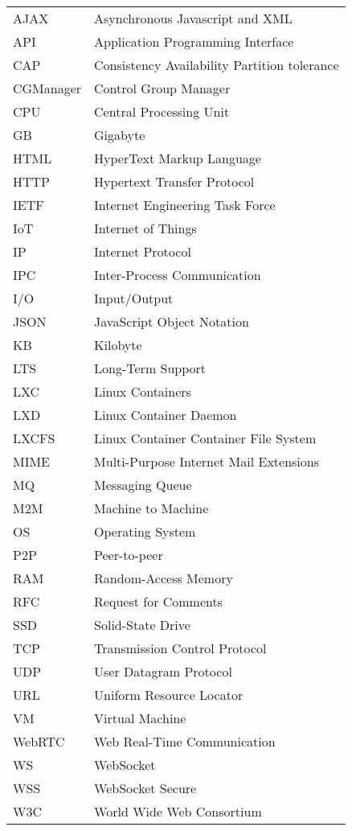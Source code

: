 \begin{longtable}{@{}p{}p{}@{}}
AJAX & Asynchronous Javascript and XML \\
API & Application Programming Interface \\
CAP & Consistency Availability Partition tolerance \\
CGManager & Control Group Manager \\
CPU & Central Processing Unit \\
GB & Gigabyte \\
HTML & HyperText Markup Language \\
HTTP & Hypertext Transfer Protocol \\
IETF & Internet Engineering Task Force \\
IoT & Internet of Things \\
IP & Internet Protocol \\
IPC & Inter-Process Communication \\
I/O & Input/Output \\
JSON & JavaScript Object Notation \\
KB & Kilobyte \\
LTS & Long-Term Support \\
LXC & Linux Containers \\
LXD & Linux Container Daemon \\
LXCFS & Linux Container Container File System \\
MIME & Multi-Purpose Internet Mail Extensions \\
MQ & Messaging Queue \\
M2M & Machine to Machine \\
OS & Operating System \\
P2P & Peer-to-peer \\
RAM & Random-Access Memory \\
RFC & Request for Comments \\
SSD & Solid-State Drive \\
TCP & Transmission Control Protocol \\
UDP & User Datagram Protocol \\
URL & Uniform Resource Locator \\
VM & Virtual Machine \\
WebRTC & Web Real-Time Communication \\
WS & WebSocket \\
WSS & WebSocket Secure \\
W3C & World Wide Web Consortium \\


\end{longtable}
